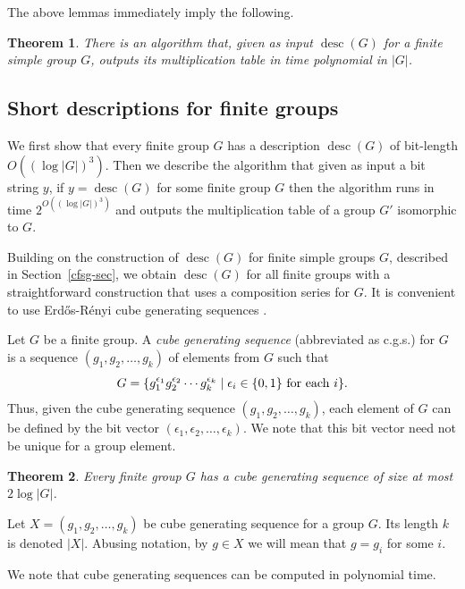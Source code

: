 \documentclass{elsarticle}
\newtheorem{theorem}{Theorem}[section]
\newcommand{\desc}{\mathop{\mathrm{desc}}}
\begin{document}
  The above lemmas immediately imply the following.

  \begin{theorem}\label{desc-simple}
    There is an algorithm that, given as input $\desc(G)$ for a
    finite simple group $G$, outputs its multiplication table
    in time polynomial in $|G|$.
   \end{theorem}

\subsection{Short descriptions for finite groups}
We first show that every finite group $G$ has a description $\desc(G)$
of bit-length $O((\log|G|)^3)$.  Then we describe the algorithm that
given as input a bit string $y$, if $y=\desc(G)$ for some finite group
$G$ then the algorithm runs in time $2^{O((\log|G|)^3)}$ and outputs the
multiplication table of a group $G'$ isomorphic to $G$.

Building on the construction of $\desc(G)$ for finite simple groups
$G$, described in Section~\ref{cfsg-sec}, we obtain $\desc(G)$ for all
finite groups with a straightforward construction that uses a
composition series for $G$. It is convenient to use
Erd\H{o}s-R\'{e}nyi cube generating sequences \cite{ER}.

\begin{defn}
  Let $G$ be a finite group. A \emph{cube generating sequence}
  (abbreviated as c.g.s.) for $G$ is a sequence $(g_1,g_2,\ldots,g_k)$
  of elements from $G$ such that
  \[
  G=\{g_1^{\epsilon_1}g_2^{\epsilon_2}\cdots g_k^{\epsilon_k}\mid \epsilon_i\in\{0,1\}
  \hbox{ for each } i\}.
  \]
Thus, given the cube generating sequence $(g_1,g_2,\ldots,g_k)$, each
element of $G$ can be defined by the bit vector
$(\epsilon_1,\epsilon_2,\ldots,\epsilon_k)$. We note that this bit
vector need not be unique for a group element.
\end{defn}

\begin{theorem}\label{ER}{\rm\cite{ER}}
Every finite group $G$ has a cube generating sequence of size at most $2\log
|G|$.
\end{theorem}

Let $X=(g_1,g_2,\ldots,g_k)$ be cube generating sequence for a group
$G$. Its length $k$ is denoted $|X|$. Abusing notation, by $g\in X$ we
will mean that $g=g_i$ for some $i$.

We note that cube generating sequences can be computed in polynomial
time.
\end{document}
